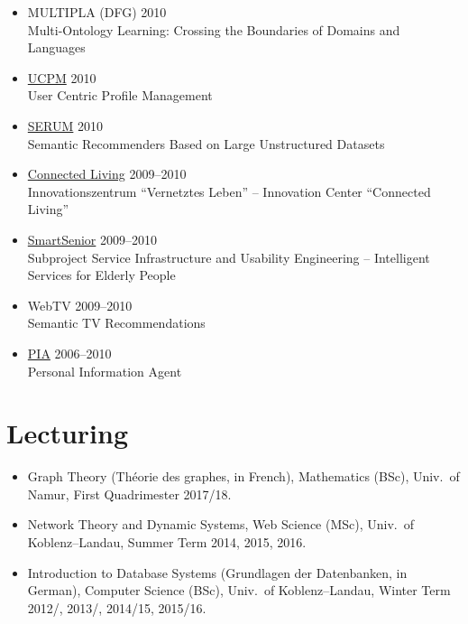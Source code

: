 \documentclass[line,mm]{res}
\newcounter{y}
\begin{document}
\begin{resume}
\begin{itemize}
\item MULTIPLA (DFG) \hfill 2010 \\
  Multi-Ontology Learning:  Crossing the Boundaries of Domains and Languages
\item \href{http://www.dai-labor.de/en/irml/ucpm/}{UCPM} \hfill 2010 \\
  User Centric Profile Management
\item \href{http://www.dai-labor.de/en/irml/serum/}{SERUM} \hfill 2010 \\
  Semantic Recommenders Based on Large Unstructured Datasets
\item \href{http://www.connected-living.org/}{Connected Living} \hfill 2009--2010 \\
   Innovationszentrum ``Vernetztes Leben'' -- Innovation Center ``Connected Living''
\item \href{http://www1.smart-senior.de/}{SmartSenior} \hfill 2009--2010 \\
  Subproject Service Infrastructure and Usability Engineering -- Intelligent Services for Elderly People
\item WebTV \hfill 2009--2010 \\
  Semantic TV Recommendations
\item \href{http://pia-services.de/}{PIA} \hfill 2006--2010 \\
  Personal Information Agent 
\end{itemize}

\section{Lecturing}
\begin{itemize}
\item Graph Theory (Théorie des graphes, in French), Mathematics (BSc),
  Univ.\ of Namur, First Quadrimester 2017/18.   
\item Network Theory and Dynamic Systems, Web Science (MSc), Univ.\ of
  Koblenz--Landau, Summer Term 2014, 2015, 2016.   
\item Introduction to Database Systems (Grundlagen der Datenbanken, in
  German), Computer Science (BSc), Univ.\ of Koblenz--Lan\-dau, 
  Winter Term 2012/, 2013/, 2014/15, 2015/16.
\end{itemize}


\end{resume}
\end{document}
